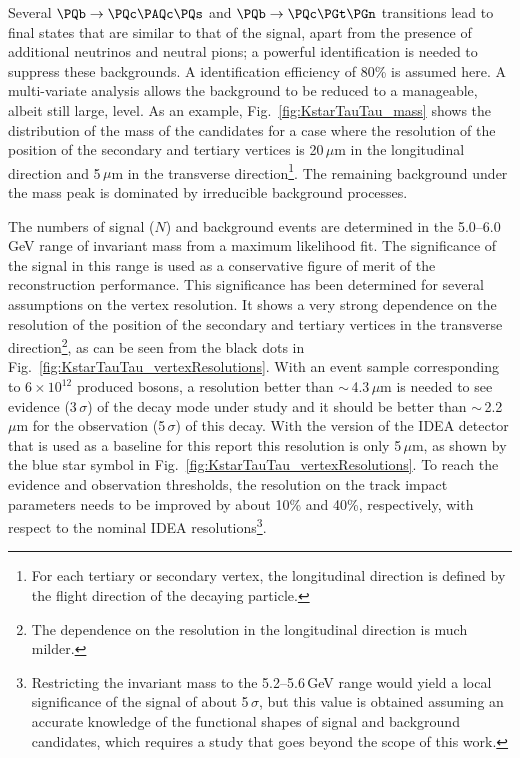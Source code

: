 Several $\PQb \to \PQc \PAQc \PQs$ and $\PQb \to \PQc \PGt \PGn$ transitions lead to final states that are similar to that of the signal, 
apart from the presence of additional neutrinos and neutral pions; 
a powerful \PGpz identification is needed to suppress these backgrounds. 
A \PGpz identification efficiency of 80\% is assumed here. 
A multi-variate analysis allows the background to be reduced to a manageable, albeit still large, level. 
As an example, Fig.~\ref{fig:KstarTauTau_mass} shows the distribution of the mass of the \PB candidates 
for a case where the resolution of the position of the secondary and tertiary vertices is 
20\,$\mu$m in the longitudinal direction and 5\,$\mu$m in the transverse 
direction\footnote{For each tertiary or secondary vertex, the longitudinal direction is defined by the flight direction of the decaying particle.}. 
The remaining background under the \PB mass peak is dominated by irreducible background processes.

The numbers of signal ($N$) and background events are determined in the 5.0--6.0\,GeV range of invariant mass from a maximum likelihood fit. 
The significance of the signal in this range is used as a conservative figure of merit of the reconstruction performance. 
This significance has been determined for several assumptions on the vertex resolution. 
It shows a very strong dependence on the resolution of the position of the secondary and tertiary vertices in the transverse 
direction\footnote{The dependence on the resolution in the longitudinal direction is much milder.}, 
as can be seen from the black dots in Fig.~\ref{fig:KstarTauTau_vertexResolutions}. 
With an event sample corresponding to $6 \times 10^{12}$ produced \PZ bosons, 
a resolution better than $\sim$\,4.3\,$\mu$m is needed to see evidence (3\,$\sigma$) of the decay mode under study 
and it should be better than $\sim$\,2.2\,$\mu$m for the observation (5\,$\sigma$) of this decay. 
With the version of the IDEA detector that is used as a baseline for this report this resolution is only 5\,$\mu$m, 
as shown by the blue star symbol in Fig.~\ref{fig:KstarTauTau_vertexResolutions}. 
To reach the evidence and observation thresholds, 
the resolution on the track impact parameters needs to be improved by about 10\% and 40\%, respectively, 
with respect to the nominal IDEA 
resolutions\footnote{Restricting the invariant mass to the 5.2--5.6\,GeV range would yield a local significance of the signal of about 5\,$\sigma$, but this value is obtained assuming an accurate knowledge of the functional shapes of signal and background candidates, which requires a study that goes beyond the scope of this work.}.

